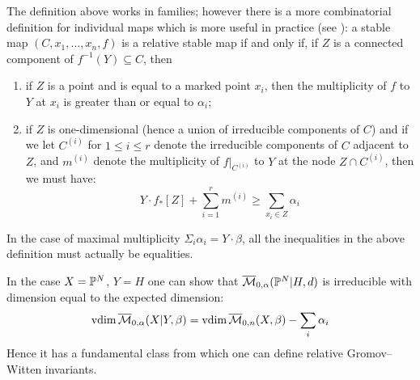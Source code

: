 \begin{remark} The definition above works in families; however there is a more combinatorial definition for individual maps which is more useful in practice (see \cite[Remark 1.4]{Ga}): a stable map $(C,x_1, \ldots, x_n,f)$ is a relative stable map if and only if, if $Z$ is a connected component of $f^{-1}(Y) \subseteq C$, then
\begin{enumerate}
\item if $Z$ is a point and is equal to a marked point $x_i$, then the multiplicity of $f$ to $Y$ at $x_i$ is greater than or equal to $\alpha_i$;
\item if $Z$ is one-dimensional (hence a union of irreducible components of $C$) and if we let $C^{(i)}$ for $1 \leq i \leq r$ denote the irreducible components of $C$ adjacent to $Z$, and $m^{(i)}$ denote the multiplicity of $f|_{C^{(i)}}$ to $Y$ at the node $Z \cap C^{(i)}$, then we must have:
\begin{equation} \label{Inequality relative stable maps} Y \cdot f_* [Z] + \sum_{i=1}^r m^{(i)} \geq \sum_{x_i \in Z} \alpha_i \end{equation}
\end{enumerate} \end{remark}

\begin{remark} In the case of maximal multiplicity $\Sigma_{i} \alpha_i = Y \cdot \beta$, all the inequalities in the above definition must actually be equalities. \end{remark}

In the case $X=\mathbb P^N$, $Y=H$ one can show that $\overline{\mathcal M}_{0,\alpha}(\mathbb P^N|H,d)$ is irreducible with dimension equal to the expected dimension:
\begin{equation*} \operatorname{vdim} \overline{\mathcal M}_{0,\alpha}(X|Y,\beta) = \operatorname{vdim}{\overline{\mathcal M}_{0,n}(X,\beta)} - \sum_i \alpha_i \end{equation*}
Hence it has a fundamental class from which one can define relative Gromov--Witten invariants.

